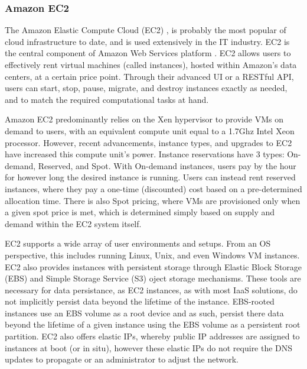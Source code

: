 
\subsubsection{Amazon EC2}


 The Amazon Elastic Compute Cloud (EC2) \cite{www-amazon-ec2}, is probably the most popular of cloud infrastructure to date, and is used extensively in the IT industry. EC2 is the central component of Amazon Web Services platform \cite{www-aws}. EC2 allows users to effectively rent virtual machines (called instances), hosted within Amazon's data centers, at a certain price point. Through their advanced UI or a RESTful API, users can start, stop, pause, migrate, and destroy instances exactly as needed, and to match the required computational tasks at hand.   

Amazon EC2 predominantly relies on the Xen hypervisor to provide VMs on demand to users, with an equivalent compute unit equal to a 1.7Ghz Intel Xeon processor.  However, recent advancements, instance types, and upgrades to EC2 have increased this compute unit's power. Instance reservations have 3 types: On-demand, Reserved, and Spot. With On-demand instances, users pay by the hour for however long the desired instance is running. Users can instead rent reserved instances, where they pay a one-time (discounted) cost based on a pre-determined allocation time. There is also Spot pricing, where VMs are provisioned only when a given spot price is met, which is determined simply based on supply and demand within the EC2 system itself. 

EC2 supports a wide array of user environments and setups. From an OS perspective, this includes running Linux, Unix, and even Windows VM instances. EC2 also provides instances with persistent storage through Elastic Block Storage (EBS) and Simple Storage Service (S3) oject storage mechanisms. These tools are necessary for data persistance, as EC2 instances, as with most IaaS solutions, do not implicitly persist data beyond the lifetime of the instance. EBS-rooted instances use an EBS volume as a root device and as such, persist there data beyond the lifetime of a given instance using the EBS volume as a persistent root partition. EC2 also offers elastic IPs, whereby public IP addresses are assigned to instances at boot (or in situ), however these elastic IPs do not require the DNS updates to propagate or an administrator to adjust the network.  

